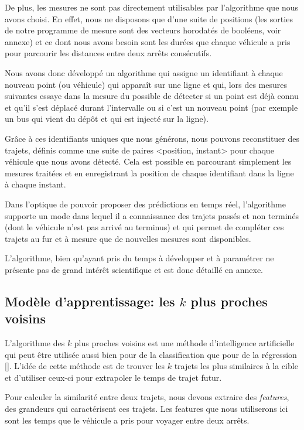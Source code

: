 \documentclass[letterpaper]{article}
\begin{document}
De plus, les mesures ne sont pas directement utilisables par l'algorithme que nous avons choisi. En effet, nous ne disposons que d'une suite de positions (les sorties de notre programme de mesure sont des vecteurs horodatés de booléens, voir annexe) et ce dont nous avons besoin sont les durées que chaque véhicule a pris pour parcourir les distances entre deux arrêts consécutifs.

Nous avons donc développé un algorithme qui assigne un identifiant à chaque nouveau point (ou véhicule) qui apparaît sur une ligne et qui, lors des mesures suivantes essaye dans la mesure du possible de détecter si un point est déjà connu et qu'il s'est déplacé durant l’intervalle ou si c'est un nouveau point (par exemple un bus qui vient du dépôt et qui est injecté sur la ligne).

Grâce à ces identifiants uniques que nous générons, nous pouvons reconstituer des trajets, définis comme une suite de paires <position, instant> pour chaque véhicule que nous avons détecté. Cela est possible en parcourant simplement les mesures traitées et en enregistrant la position de chaque identifiant dans la ligne à chaque instant.

Dans l'optique de pouvoir proposer des prédictions en temps réel, l'algorithme supporte un mode dans lequel il a connaissance des trajets passés et non terminés (dont le véhicule n'est pas arrivé au terminus) et qui permet de compléter ces trajets au fur et à mesure que de nouvelles mesures sont disponibles.

L'algorithme, bien qu'ayant pris du temps à développer et à paramétrer ne présente pas de grand intérêt scientifique et est donc détaillé en annexe.



\subsection{Modèle d'apprentissage: les $k$ plus proches voisins}

L'algorithme des $k$ plus proches voisins
est une méthode d'intelligence artificielle qui peut être utilisée aussi bien pour de la classification que pour de la régression [\cite{trevor2009elements}].
L'idée de cette méthode est de trouver les $k$ trajets les plus similaires à la cible et d'utiliser ceux-ci pour extrapoler le temps de trajet futur.

Pour calculer la similarité entre deux trajets, nous devons extraire des \textit{features}, des grandeurs qui caractérisent ces trajets. Les features que nous utiliserons ici sont les temps que le véhicule a pris pour voyager entre deux arrêts.
\end{document}
